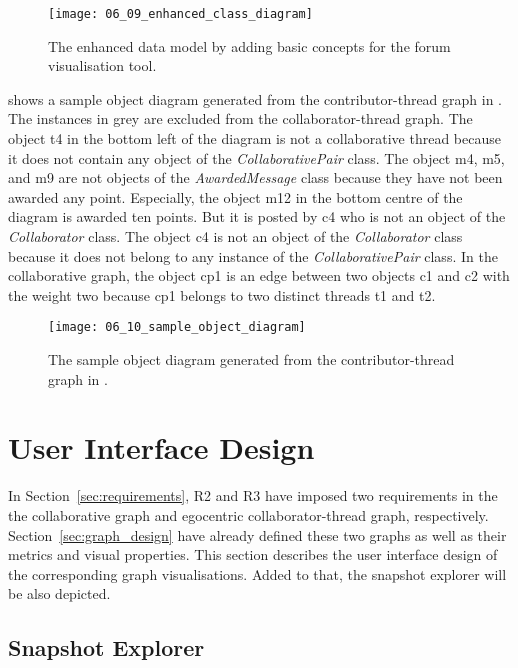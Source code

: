 \begin{figure}[!htb]
  \centering
  \texttt{[image: 06\_09\_enhanced\_class\_diagram]}
  \caption{The enhanced data model by adding basic concepts for the forum visualisation tool.}
  \label{Figure:06_09}
\end{figure}

 shows a sample object diagram generated from the contributor-thread graph in . The instances in grey are excluded from the collaborator-thread graph. The object t4 in the bottom left of the diagram is not a collaborative thread because it does not contain any object of the \emph{CollaborativePair} class. The object m4, m5, and m9 are not objects of the \emph{AwardedMessage} class because they have not been awarded any point. Especially, the object m12 in the bottom centre of the diagram is awarded ten points. But it is posted by c4 who is not an object of the \emph{Collaborator} class. The object c4 is not an object of the \emph{Collaborator} class because it does not belong to any instance of the \emph{CollaborativePair} class. In the collaborative graph, the object cp1 is an edge between two objects c1 and c2 with the weight two because cp1 belongs to two distinct threads t1 and t2.

\begin{figure}[!htb]
  \centering
  \texttt{[image: 06\_10\_sample\_object\_diagram]}
  \caption{The sample object diagram generated from the contributor-thread graph in .}
  \label{Figure:06_10}
\end{figure}

\section{User Interface Design}

In Section~\ref{sec:requirements}, R2 and R3 have imposed two requirements in the the collaborative graph and egocentric collaborator-thread graph, respectively. Section~\ref{sec:graph_design} have already defined these two graphs as well as their metrics and visual properties.
This section describes the user interface design of the corresponding graph visualisations. Added to that, the snapshot explorer will be also depicted.

\subsection{Snapshot Explorer}

